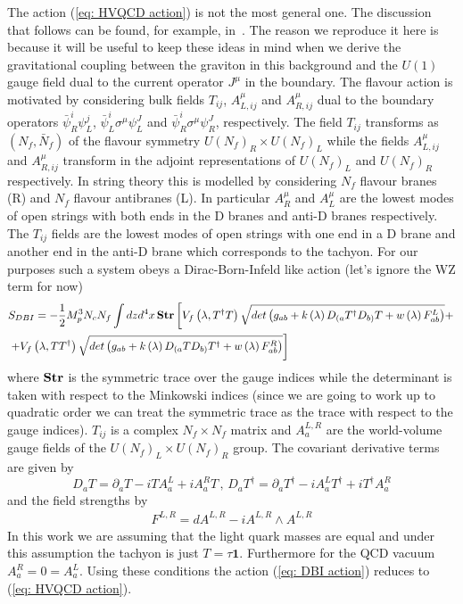 \documentclass[10 pt]{article}
\begin{document}
The action (\ref{eq: HVQCD action}) is not the most general one. The discussion that follows can be found, for example, in~\cite{Jarvinen:2011qe}. The reason we reproduce it here is because it will be useful to keep these ideas in mind when we derive the gravitational coupling between the graviton in this background and the $U(1)$ gauge field dual to the current operator $J^\mu$ in the boundary. The flavour action is motivated by considering bulk fields $T_{ij}$, $A^\mu_{L, i j}$ and $A^\mu_{R, i j}$ dual to the boundary operators $\bar{\psi}^i_R \psi^j_L$, $\bar{\psi}^i_L \sigma^\mu \psi^J_L$ and $\bar{\psi}^i_R \sigma^\mu \psi^J_R$, respectively. The field $T_{ij}$ transforms as $\left(N_f, \bar{N}_f \right)$ of the flavour symmetry $U\left(N_f\right)_R \times U \left(N_f\right)_L$ while the fields $A^\mu_{L, i j}$ and $A^\mu_{R, i j}$ transform in the adjoint representations of $U\left(N_f\right)_L$ and  $U \left(N_f\right)_R$ respectively. In string theory this is modelled by considering $N_f$ flavour branes (R) and $N_f$ flavour antibranes (L). In particular $A^\mu_R$ and $A^\mu_L$ are the lowest modes of open strings with both ends in the D branes and anti-D branes respectively. The $T_{ij}$ fields are the lowest modes of open strings with one end in a D brane and another end in the anti-D brane which corresponds to the tachyon. For our purposes such a system obeys a Dirac-Born-Infeld like action (let's ignore the WZ term for now)
\begin{align}
&S_{DBI} = - \frac{1}{2} M_p^3 N_c N_f \int dz d^4 x \, \bold{Str} \left[ V_f \left(\lambda, T^{\dagger} T\right) \sqrt{det\left( g_{ab} + k\left(\lambda\right)D_{(a}T^{\dagger}D_{b)}T + w\left(\lambda\right) F^{L}_{ab}\right)} + \right. \\ \notag
&\left. + V_f \left(\lambda, T T^{\dagger} \right) \sqrt{det\left( g_{ab} + k\left(\lambda\right)D_{(a}TD_{b)}T^{\dagger} + w\left(\lambda\right) F^{R}_{ab}\right)}  \right]
\label{eq: DBI action}
\end{align}
where $\bold{Str}$ is the symmetric trace over the gauge indices while the determinant is taken with respect to the Minkowski indices (since we are going to work up to quadratic order we can treat the symmetric trace as the trace with respect to the gauge indices). $T_{ij}$ is a complex $N_f \times N_f$ matrix and $A^{L,R}_a$ are the world-volume gauge fields of the $U(N_f)_L \times U(N_f)_R$ group. The covariant derivative terms are given by
\begin{equation}
D_a T = \partial_a T - i T A^L_a + i A^R_a T \, , \, D_a T^{\dagger} = \partial_a T^{\dagger} - i  A^L_a T^{\dagger}+ i T^{\dagger} A^R_a 
\end{equation}
and the field strengths by
\begin{align}
F^{L,R} = d A^{L,R} - i A^{L,R} \wedge A^{L,R}
\end{align}
In this work we are assuming that the light quark masses are equal and under this assumption the tachyon is just $T = \tau \mathbf{1}$. Furthermore for the QCD vacuum $A^R_a = 0 = A^L_a$. Using these conditions the action (\ref{eq: DBI action}) reduces to (\ref{eq: HVQCD action}).
\end{document}
